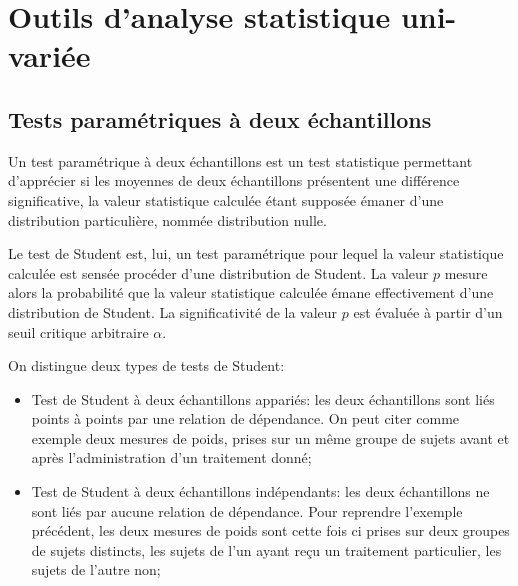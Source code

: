 \chapter{Outils d'analyse statistique uni-variée}
\label{app:statuni}


\section{Tests paramétriques à deux échantillons}
\label{app:student}

Un test paramétrique à deux échantillons est un test statistique permettant d'apprécier si les moyennes de deux échantillons présentent une différence significative, la valeur statistique calculée étant supposée émaner d'une distribution particulière, nommée distribution nulle. 

Le test de Student est, lui, un test paramétrique pour lequel la valeur statistique calculée est sensée procéder d'une distribution de Student. La valeur $p$ mesure alors la probabilité que la valeur statistique calculée émane effectivement d'une distribution de Student. La significativité de la valeur $p$ est évaluée à partir d'un seuil critique arbitraire $\alpha$.

On distingue deux types de tests de Student:

\begin{itemize}
\item Test de Student à deux échantillons appariés: les deux échantillons sont liés points à points par une relation de dépendance. On peut citer comme exemple deux mesures de poids, prises sur un même groupe de sujets avant et après l'administration d'un traitement donné; 
\item Test de Student à deux échantillons indépendants: les deux échantillons ne sont liés par aucune relation de dépendance. Pour reprendre l'exemple précédent, les deux mesures de poids sont cette fois ci prises sur deux groupes de sujets distincts, les sujets de l'un ayant reçu un traitement particulier, les sujets de l'autre non;
\end{itemize}

